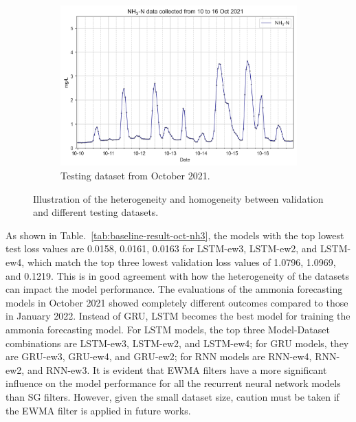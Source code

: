\begin{figure}[!ht]
\begin{subfigure}[t]{0.6\textwidth}
    \includegraphics[width=\linewidth]{imgs/results/heterogeneity-test-oct.png}
    \caption{Testing dataset from October 2021.} \label{fig:oct-test-data}
  \end{subfigure} 
\caption{Illustration of the heterogeneity and homogeneity between validation and different testing datasets.} \label{fig:heterogeneity}
\end{figure}


As shown in Table.~\ref{tab:baseline-result-oct-nh3}, the models with the top lowest test loss values are 0.0158, 0.0161, 0.0163 for LSTM-ew3, LSTM-ew2, and LSTM-ew4, which match the top three lowest validation loss values of 1.0796, 1.0969, and 0.1219. This is in good agreement with how the heterogeneity of the datasets can impact the model performance. The evaluations of the ammonia forecasting models in October 2021 showed completely different outcomes compared to those in January 2022. Instead of GRU, LSTM becomes the best model for training the ammonia forecasting model. For LSTM models, the top three Model-Dataset combinations are LSTM-ew3, LSTM-ew2, and LSTM-ew4; for GRU models, they are GRU-ew3, GRU-ew4, and GRU-ew2; for RNN models are RNN-ew4, RNN-ew2, and RNN-ew3. It is evident that EWMA filters have a more significant influence on the model performance for all the recurrent neural network models than SG filters. However, given the small dataset size, caution must be taken if the EWMA filter is applied in future works.

